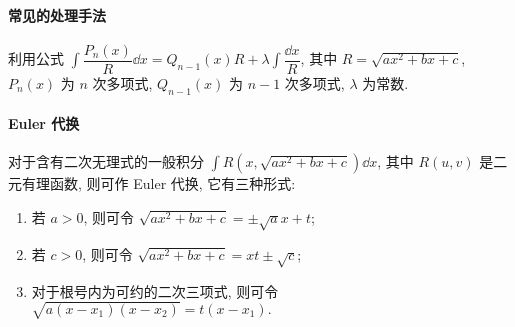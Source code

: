 \paragraph{常见的处理手法}利用公式 $\displaystyle\int\dfrac{P_n(x)}{R}\dd x=Q_{n-1}(x)R+\lambda\int\dfrac{\dd x}{R}$, 其中 $R=\sqrt{ax^2+bx+c}$, $P_n(x)$ 为 $n$ 次多项式, 
$Q_{n-1}(x)$ 为 $n-1$ 次多项式, $\lambda$ 为常数.

\paragraph{Euler 代换}
对于含有二次无理式的一般积分 $ \displaystyle\int R\left(x, \sqrt{a x^{2}+b x+c}\right) \dd  x$, 其中 $ R(u, v) $ 是二元有理函数, 则可作 Euler 代换, 它有三种形式:
\begin{enumerate}[label=(\arabic{*})]
    \item 若 $ a>0 $, 则可令 $ \sqrt{a x^{2}+b x+c}=\pm \sqrt{a} x+t$;
    \item 若 $ c>0 $, 则可令 $ \sqrt{a x^{2}+b x+c}=x t \pm \sqrt{c}$;
    \item 对于根号内为可约的二次三项式, 则可令 $ \sqrt{a\left(x-x_{1}\right)\left(x-x_{2}\right)}=t\left(x-x_{1}\right).$
\end{enumerate}

